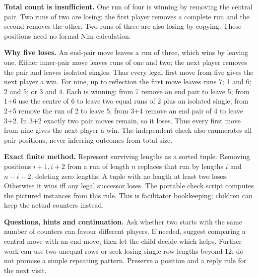 \documentclass[11pt]{article}
\newcommand{\labelled}[2]{\textbf{#1} #2\par}
\begin{document}
\labelled{Total count is insufficient.}{One run of four is winning by removing the central pair. Two runs of two are losing: the first player removes a complete run and the second removes the other. Two runs of three are also losing by copying. These positions need no formal Nim calculation.}
\labelled{Why five loses.}{An end-pair move leaves a run of three, which wins by leaving one. Either inner-pair move leaves runs of one and two; the next player removes the pair and leaves isolated singles. Thus every legal first move from five gives the next player a win. For nine, up to reflection the first move leaves runs 7; 1 and 6; 2 and 5; or 3 and 4. Each is winning: from 7 remove an end pair to leave 5; from 1+6 use the centre of 6 to leave two equal runs of 2 plus an isolated single; from 2+5 remove the run of 2 to leave 5; from 3+4 remove an end pair of 4 to leave 3+2. In 3+2 exactly two pair moves remain, so it loses. Thus every first move from nine gives the next player a win. The independent check also enumerates all pair positions, never inferring outcomes from total size.}
\labelled{Exact finite method.}{Represent surviving lengths as a sorted tuple. Removing positions $i+1,i+2$ from a run of length $n$ replaces that run by lengths $i$ and $n-i-2$, deleting zero lengths. A tuple with no length at least two loses. Otherwise it wins iff any legal successor loses. The portable check script computes the pictured instances from this rule. This is facilitator bookkeeping; children can keep the actual counters instead.}
\labelled{Questions, hints and continuation.}{Ask whether two starts with the same number of counters can favour different players. If needed, suggest comparing a central move with an end move, then let the child decide which helps. Further work can use two unequal rows or seek losing single-row lengths beyond 12; do not promise a simple repeating pattern. Preserve a position and a reply rule for the next visit.}
\end{document}
